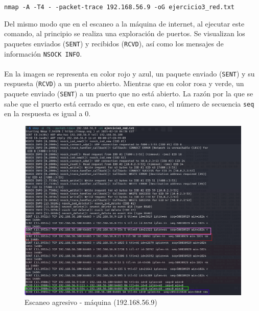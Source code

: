 \documentclass[a4paper,12pt]{article} %
\begin{document}
    \begin{center}
    \texttt{nmap -A -T4  - -packet-trace  192.168.56.9 -oG ejercicio3\_red.txt}
    \end{center}

    Del mismo modo que en el escaneo a la máquina de internet, al ejecutar este comando, al principio se realiza una exploración de puertos. Se visualizan los paquetes enviados (\texttt{SENT}) y recibidos (\texttt{RCVD}), así como los mensajes de información \texttt{NSOCK INFO}.
    \\ \\
    En la imagen se representa en color rojo y azul, un paquete enviado (\texttt{SENT}) y su respuesta (\texttt{RCVD}) a un puerto abierto. Mientras que en color rosa y verde, un paquete enviado (\texttt{SENT}) a un puerto que no está abierto. La razón por la que se sabe que el puerto está cerrado es que, en este caso, el número de secuencia \texttt{seq} en la respuesta es igual a 0. 
\newpage
        \begin{figure} [hp!]
         \centering
         \includegraphics[width=1\textwidth]{Imagenes/sentred.png}
         \caption{Escaneo agresivo - máquina (192.168.56.9) }
         \label{fig:wireshark2}
        \end{figure}
\end{document}
